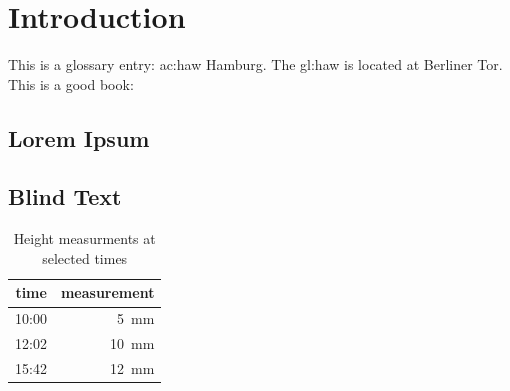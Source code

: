 %

\chapter{Introduction}
This is a glossary entry: \gls{ac:haw} Hamburg.
The \gls{gl:haw} is located at Berliner Tor.
This is a good book: \cite{adams1995douglas}

\section{Lorem Ipsum}
\lipsum

\section{Blind Text}
\blindtext


\blindmathtrue
\blindmathfalse

\begin{table}[ht]
  \caption{Height measurments at selected times}\label{table:measurements}
  \begin{center}
    \begin{tabular}{r|r}
      time & measurement\\
      \hline
      10:00 &  5~mm\\
      12:02 & 10~mm\\
      15:42 & 12~mm\\
    \end{tabular}
  \end{center}
\end{table}

\lipsum
